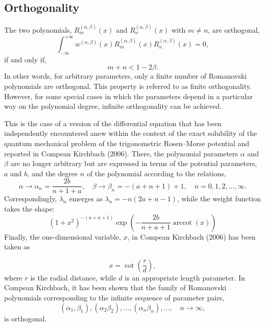\documentclass{article}
\newcommand{\tmop}[1]{\ensuremath{\operatorname{#1}}}
\begin{document}
\subsection*{Orthogonality}

The two polynomials, $R_m^{(\alpha, \beta)} (x)$ and $R_n^{(\alpha, \beta)}
(x)$ with $m \neq n$, are orthogonal,{\cite{Raposo2007}}
\begin{equation}
  \int_{- \infty}^{+ \infty} w^{(\alpha, \beta)} (x) R_m^{(\alpha, \beta)} (x)
  R_n^{(\alpha, \beta)} (x) = 0,
\end{equation}
if and only if,
\begin{equation}
  m + n < 1 - 2 \beta .
\end{equation}
In other words, for arbitrary parameters, only a finite number of Romanovski
polynomials are orthogonal. This property is referred to as finite
orthogonality. However, for some special cases in which the parameters depend
in a particular way on the polynomial degree, infinite orthogonality can be
achieved.

This is the case of a version of the differential equation that has been
independently encountered anew within the context of the exact solubility of
the quantum mechanical problem of the trigonometric Rosen--Morse potential and
reported in Compean Kirchbach (2006).{\cite{Compean2006}} There, the
polynomial parameters $\alpha$ and $\beta$ are no longer arbitrary but are
expressed in terms of the potential parameters, $a$ and $b$, and the degree
$n$ of the polynomial according to the relations,
\begin{equation}
  \alpha \to \alpha_n = \frac{2 b}{n + 1 + a}, \quad \beta \to \beta_n = - (a
  + n + 1) + 1, \quad n = 0, 1, 2, \ldots, \infty .
\end{equation}
Correspondingly, $\lambda_n$ emerges as $\lambda_n = - n (2 a + n - 1)$, while
the weight function takes the shape:
\begin{equation}
  (1 + x^2)^{- (a + n + 1)} \exp \left( - \frac{2 b}{n + a + 1} \tmop{arccot}
  (x) \right) \text{}
\end{equation}
Finally, the one-dimensional variable, $x$, in Compean Kirchbach
(2006){\cite{Compean2006}} has been taken as


\[ x = \cot \left( \frac{r}{d} \right), \]
where $r$ is the radial distance, while $d$ is an appropriate length
parameter. In Compean Kirchbach,{\cite{Compean2006}} it has been shown that
the family of Romanovski polynomials corresponding to the infinite sequence of
parameter pairs,
\begin{equation}
  (\alpha_1, \beta_1), (\alpha_2 \beta_2), \ldots, (\alpha_n \beta_n), \ldots,
  \quad n \longrightarrow \infty,
\end{equation}
is orthogonal.
\end{document}
